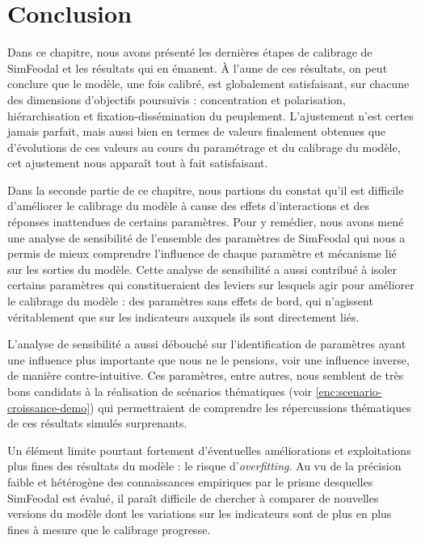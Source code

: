 \section*{Conclusion}

Dans ce chapitre, nous avons présenté les dernières étapes de calibrage de SimFeodal et les résultats qui en émanent.
À l'aune de ces résultats, on peut conclure que le modèle, une fois calibré, est globalement satisfaisant, sur chacune des dimensions d'objectifs poursuivis : concentration et polarisation, hiérarchisation et fixation-dissémination du peuplement.
L'ajustement n'est certes jamais parfait, mais aussi bien en termes de valeurs finalement obtenues que d'évolutions de ces valeurs au cours du paramétrage et du calibrage du modèle, cet ajustement nous apparaît tout à fait satisfaisant.

Dans la seconde partie de ce chapitre, nous partions du constat qu'il est difficile d'améliorer le calibrage du modèle à cause des effets d'interactions et des réponses inattendues de certains paramètres.
Pour y remédier, nous avons mené une analyse de sensibilité de l'ensemble des paramètres de SimFeodal qui nous a permis de mieux comprendre l'influence de chaque paramètre et mécanisme lié sur les sorties du modèle.
Cette analyse de sensibilité a aussi contribué à isoler certains paramètres qui constitueraient des leviers sur lesquels agir pour améliorer le calibrage du modèle : des paramètres sans effets de bord, qui n'agissent véritablement que sur les indicateurs auxquels ils sont directement liés.

L'analyse de sensibilité a aussi débouché sur l'identification de paramètres ayant une influence plus importante que nous ne le pensions, voir une influence inverse, de manière contre-intuitive.
Ces paramètres, entre autres, nous semblent de très bons candidats à la réalisation de scénarios thématiques (voir \cref{enc:scenario-croissance-demo}) qui permettraient de comprendre les répercussions thématiques de ces résultats simulés surprenants.

Un élément limite pourtant fortement d'éventuelles améliorations et exploitations plus fines des résultats du modèle : le risque d'\textit{overfitting}.
Au vu de la précision faible et hétérogène des connaissances empiriques par le prisme desquelles SimFeodal est évalué, il paraît difficile de chercher à comparer de nouvelles versions du modèle dont les variations sur les indicateurs sont de plus en plus fines à mesure que le calibrage progresse.

